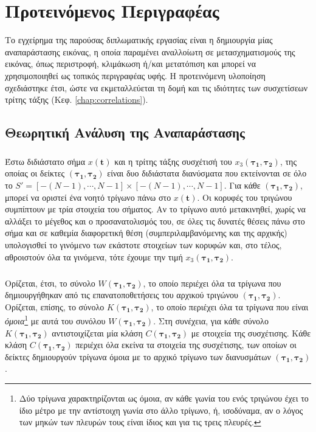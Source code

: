 \chapter{Προτεινόμενος Περιγραφέας} \label{chap:sug}
Το εγχείρημα της παρούσας διπλωματικής εργασίας είναι η δημιουργία μίας αναπαράστασης εικόνας, η οποία παραμένει αναλλοίωτη σε μετασχηματισμούς της εικόνας, όπως περιστροφή, κλιμάκωση ή/και μετατόπιση και μπορεί να χρησιμοποιηθεί ως τοπικός περιγραφέας υφής. Η προτεινόμενη υλοποίηση σχεδιάστηκε έτσι, ώστε να εκμεταλλεύεται τη δομή και τις ιδιότητες των συσχετίσεων τρίτης τάξης (Κεφ. \ref{chap:correlations}).
\section{Θεωρητική Ανάλυση της Αναπαράστασης} \label{chap:theor}
\paragraph*{}
Έστω διδιάστατο σήμα $x(\textbf{t})$ και η τρίτης τάξης συσχέτισή του $x_3(\boldsymbol{\tau_1},\boldsymbol{\tau_2})$, της οποίας οι δείκτες $(\boldsymbol{\tau_1},\boldsymbol{\tau_2})$ είναι δυο διδιάστατα διανύσματα που εκτείνονται σε όλο το $S'=[-(N-1), \cdots ,N-1]\times[-(N-1), \cdots ,N-1]$. Για κάθε $(\boldsymbol{\tau_1},\boldsymbol{\tau_2})$, μπορεί να οριστεί ένα νοητό τρίγωνο πάνω στο  $x(\textbf{t})$. Οι κορυφές του τριγώνου συμπίπτουν με τρία στοιχεία του σήματος. Αν το τρίγωνο αυτό μετακινηθεί, χωρίς να αλλάξει το μέγεθος και ο προσανατολισμός του, σε όλες τις δυνατές θέσεις πάνω στο σήμα και σε καθεμία διαφορετική θέση (συμπεριλαμβανόμενης και της αρχικής) υπολογισθεί το γινόμενο των εκάστοτε στοιχείων των κορυφών και, στο τέλος, αθροιστούν όλα τα γινόμενα, τότε έχουμε την τιμή $x_3(\boldsymbol{\tau_1},\boldsymbol{\tau_2})$.
\paragraph*{}
Ορίζεται, έτσι, το σύνολο $W(\boldsymbol{\tau_1},\boldsymbol{\tau_2})$, το οποίο περιέχει όλα τα τρίγωνα που δημιουργήθηκαν από τις επανατοποθετήσεις του αρχικού τριγώνου $(\boldsymbol{\tau_1},\boldsymbol{\tau_2})$. Ορίζεται, επίσης, το σύνολο $K(\boldsymbol{\tau_1},\boldsymbol{\tau_2})$, το οποίο περιέχει όλα τα τρίγωνα που είναι \textit{όμοια}\footnote{Δύο τρίγωνα χαρακτηρίζονται ως όμοια, αν κάθε γωνία του ενός τριγώνου έχει το ίδιο μέτρο με την αντίστοιχη γωνία στο άλλο τρίγωνο, ή, ισοδύναμα, αν ο λόγος των μηκών των πλευρών τους είναι ίδιος και για τις τρεις πλευρές.}  με αυτά του συνόλου $W(\boldsymbol{\tau_1},\boldsymbol{\tau_2})$. Στη συνέχεια, για κάθε σύνολο $K(\boldsymbol{\tau_1},\boldsymbol{\tau_2})$ αντιστοιχίζεται μία κλάση $C(\boldsymbol{\tau_1},\boldsymbol{\tau_2})$ με στοιχεία της συσχέτισης. Κάθε κλάση $C(\boldsymbol{\tau_1},\boldsymbol{\tau_2})$ περιέχει όλα εκείνα τα στοιχεία της συσχέτισης, των οποίων οι δείκτες δημιουργούν τρίγωνα όμοια με το αρχικό τρίγωνο των διανυσμάτων $(\boldsymbol{\tau_1},\boldsymbol{\tau_2})$.


